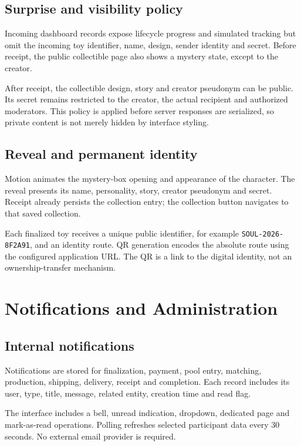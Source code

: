 \documentclass[11pt,a4paper]{article}
\begin{document}
\subsection{Surprise and visibility policy}
Incoming dashboard records expose lifecycle progress and simulated tracking but omit the incoming toy identifier, name, design, sender identity and secret. Before receipt, the public collectible page also shows a mystery state, except to the creator.

After receipt, the collectible design, story and creator pseudonym can be public. Its secret remains restricted to the creator, the actual recipient and authorized moderators. This policy is applied before server responses are serialized, so private content is not merely hidden by interface styling.

\subsection{Reveal and permanent identity}
Motion animates the mystery-box opening and appearance of the character. The reveal presents its name, personality, story, creator pseudonym and secret. Receipt already persists the collection entry; the collection button navigates to that saved collection.

Each finalized toy receives a unique public identifier, for example \texttt{SOUL-2026-8F2A91}, and an identity route. QR generation encodes the absolute route using the configured application URL. The QR is a link to the digital identity, not an ownership-transfer mechanism.

\section{Notifications and Administration}

\subsection{Internal notifications}
Notifications are stored for finalization, payment, pool entry, matching, production, shipping, delivery, receipt and completion. Each record includes its user, type, title, message, related entity, creation time and read flag.

The interface includes a bell, unread indication, dropdown, dedicated page and mark-as-read operations. Polling refreshes selected participant data every 30 seconds. No external email provider is required.
\end{document}
